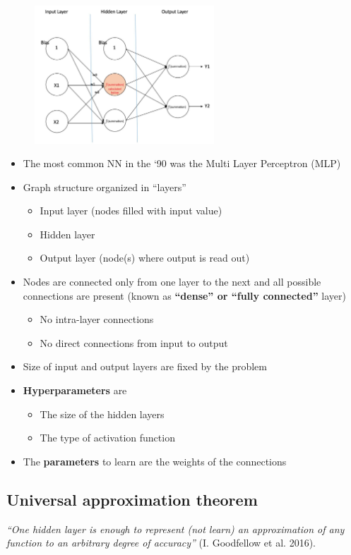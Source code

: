 \begin{figure}
	\includegraphics[width=0.6\textwidth]{figure_ml/mlp.png}
\end{figure} 
\quad
\begin{itemize}
	\item The most common NN in the ‘90 was the Multi Layer	Perceptron (MLP)
	\item Graph structure organized in “layers”
		\begin{itemize}
			\item Input layer (nodes filled with input value)
			\item Hidden layer
			\item Output layer (node(s) where output is read out)
		\end{itemize}
	\item Nodes are connected only from one layer to the next and all possible connections are present (known as \textbf{“dense” or “fully connected”} layer)
		\begin{itemize}
			\item No intra-layer connections
			\item No direct connections from input to output
		\end{itemize}
	\item Size of input and output layers are fixed by the problem
	\item \textbf{Hyperparameters} are
		\begin{itemize}
			\item The size of the hidden layers
			\item The type of activation function
		\end{itemize}
	\item The \textbf{parameters} to learn are the weights of the connections
\end{itemize}

\subsection{Universal approximation theorem}
\textit{“One hidden layer is enough to represent (not learn) an approximation of any function to an arbitrary degree of accuracy”} (I. Goodfellow et al. 2016).\\

